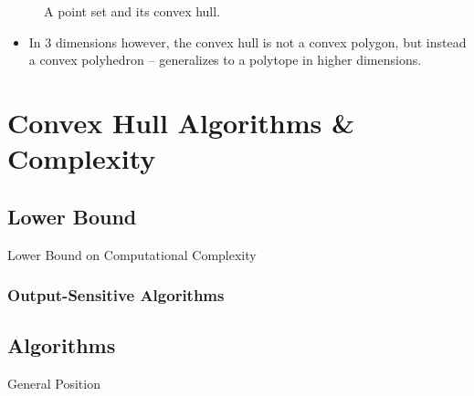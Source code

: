\documentclass{beamer}
\begin{document}
\begin{frame}[t]
\begin{figure}
\begin{subfigure}{0.35\textwidth}
      \end{subfigure}
      \caption{A point set and its convex hull.}
    \end{figure}
    \begin{itemize}
    \item In 3 dimensions however, the convex hull is not a convex polygon, but instead a 
    convex polyhedron -- generalizes to a polytope in higher dimensions.
  \end{itemize}
\end{frame}


    
    \section{Convex Hull Algorithms \& Complexity}
    \subsection{Lower Bound}
    \begin{frame}{Lower Bound on Computational Complexity}
          
    \end{frame}

    \begin{frame}
      \frametitle{Output-Sensitive Algorithms}
    \end{frame}

    \subsection{Algorithms}
    \begin{frame}{General Position}
      
    \end{frame}
    
\end{document}
